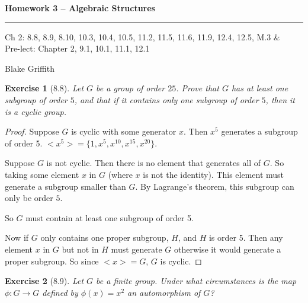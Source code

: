 \documentclass[12pt]{article}
\newtheorem*{exer}{Exercise}
\begin{document}
\textbf{Homework 3 -- Algebraic Structures} \\

\hrule

\begin{minipage}{.80\linewidth}
    \flushleft
    Ch 2: 8.8, 8.9, 8.10, 10.3, 10.4, 10.5, 11.2, 11.5, 11.6, 11.9,
    12.4, 12.5, M.3  \& \\ 
    Pre-lect: Chapter 2, 9.1, 10.1, 11.1, 12.1\\
\end{minipage}
\begin{minipage}{.20\linewidth}
    \flushright
    Blake Griffith
\end{minipage}

\begin{exer}[8.8]
Let $G$ be a group of order $25$. Prove that $G$ has at least one
subgroup of order $5$, and that if it contains only one subgroup of
order $5$, then it is a cyclic group.

\end{exer}

\begin{proof}
    Suppose $G$ is cyclic with some generator $x$. Then $x^5$ generates
    a subgroup of order 5. $<x^5> = \{1, x^5, x^{10}, x^{15}, x^{20}\}$. 

    Suppose $G$ is not cyclic. Then there is no element that generates
    all of $G$. So taking some element $x$ in $G$ (where $x$ is not the
    identity). This element must generate a subgroup smaller than $G$. By
    Lagrange's theorem, this subgroup can only be order $5$.

    So $G$ must contain at least one subgroup of order 5.

    Now if $G$ only contains one proper subgroup, $H$, and $H$ is order
    5. Then any element $x$ in $G$ but not in $H$ must generate $G$
    otherwise it would generate a proper subgroup. So since $<x> = G$,
    $G$ is cyclic.

\end{proof}


\begin{exer}[8.9]
Let $G$ be a finite group. Under what circumstances is the map $\phi:G
\rightarrow G$ defined by $\phi(x)=x^2$ an automorphism of $G$?
\end{exer}
\end{document}

